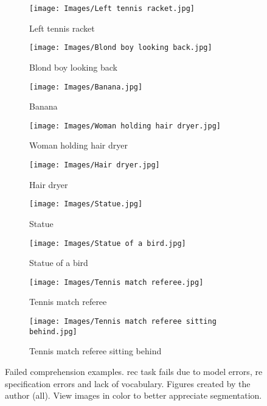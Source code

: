 \begin{figure}[p]
  \centering
  \begin{subfigure}[t]{.32\textwidth}
    \centering
    \caption{Left tennis racket}\label{fig:racket}
    \texttt{[image: Images/Left tennis racket.jpg]}
  \end{subfigure}\hfill
  \begin{subfigure}[t]{.32\textwidth}
    \centering
    \caption{Blond boy looking back}\label{fig:blond}
    \texttt{[image: Images/Blond boy looking back.jpg]}
  \end{subfigure}\hfill
  \begin{subfigure}[t]{.32\textwidth}
    \centering
    \caption{Banana}\label{fig:banana}
    \texttt{[image: Images/Banana.jpg]}
  \end{subfigure}

  \bigskip
  \begin{subfigure}[t]{.32\textwidth}
    \centering
    \caption{Woman holding hair dryer}\label{fig:dryer-1}
    \texttt{[image: Images/Woman holding hair dryer.jpg]}
  \end{subfigure}\hspace{.1\textwidth}
  \begin{subfigure}[t]{.32\textwidth}
    \centering
    \caption{Hair dryer}\label{fig:dryer-2}
    \texttt{[image: Images/Hair dryer.jpg]}
  \end{subfigure}

  \bigskip
  \begin{subfigure}[t]{.4\textwidth}
    \centering
    \caption{Statue}\label{fig:statue-1}
    \texttt{[image: Images/Statue.jpg]}
  \end{subfigure}\hspace{.06\textwidth}
  \begin{subfigure}[t]{.4\textwidth}
    \centering
    \caption{Statue of a bird}\label{fig:statue-2}
    \texttt{[image: Images/Statue of a bird.jpg]}
  \end{subfigure}

  \bigskip
  \begin{subfigure}[t]{.45\textwidth}
    \centering
    \caption{Tennis match referee}\label{fig:referee-1}
    \texttt{[image: Images/Tennis match referee.jpg]}
  \end{subfigure}\hspace{.05\textwidth}
  \begin{subfigure}[t]{.45\textwidth}
    \centering
    \caption{Tennis match referee sitting behind}\label{fig:referee-2}
    \texttt{[image: Images/Tennis match referee sitting behind.jpg]}
  \end{subfigure}
  \caption[Failed comprehension examples]{Failed comprehension
    examples. \gls{rec} task fails due to model errors, \gls{re} specification
    errors and lack of vocabulary. Figures created by the author (all). View
    images in color to better appreciate segmentation.}%
  \label{fig:failure}
\end{figure}

